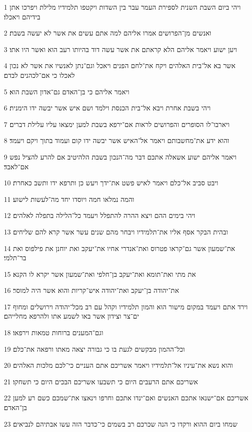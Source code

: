 \par 1 ויהי ביום השבת השנית לספירת העמר עבר בין השדות ויקטפו תלמידיו מלילת ויפרכו אתן בידיהם ויאכלו׃
\par 2 ואנשים מן־הפרושים אמרו אליהם למה אתם עשים את אשר לא יעשה בשבת׃
\par 3 ויען ישוע ויאמר אליהם הלא קראתם את אשר עשה דוד בהיותו רעב הוא ואשר היו אתו׃
\par 4 אשר בא אל־בית האלהים ויקח את־לחם הפנים ויאכל וגם־נתן לאנשיו את אשר לא נכון לאכלו כי אם־לכהנים לבדם׃
\par 5 ויאמר אליהם כי בן־האדם גם־אדון השבת הוא׃
\par 6 ויהי בשבת אחרת ויבא אל־בית הכנסת וילמד ושם איש אשר יבשה ידו הימנית׃
\par 7 ויארבו־לו הסופרים והפרושים לראות אם־ירפא בשבת למען ימצאו עליו עלילת דברים׃
\par 8 והוא ידע את־מחשבותם ויאמר אל־האיש אשר יבשה ידו קום ועמוד בתוך ויקם ויעמד׃
\par 9 ויאמר אליהם ישוע אשאלה אתכם דבר מה־הנכון בשבת הלהיטיב אם להרע להציל נפש אם־לאבד׃
\par 10 ויבט סביב אל־כלם ויאמר לאיש פשט את־ידך ויעש כן ותרפא ידו ותשב כאחרת׃
\par 11 והמה נמלאו חמה ויוסדו יחד מה־לעשות לישוע׃
\par 12 ויהי בימים ההם ויצא ההרה להתפלל ויעמד כל־הלילה בתפלה לאלהים׃
\par 13 ובהית הבקר אסף אליו את־תלמידיו ויבחר מהם שנים עשר אשר קרא להם שליחים׃
\par 14 את־שמעון אשר גם־קראו פטרוס ואת־אנדרי אחיו את־יעקב ואת יוחנן את פילפוס ואת בר־תלמי׃
\par 15 את מתי ואת־תומא ואת־יעקב בן־חלפי ואת־שמעון אשר יקרא לו הקנא׃
\par 16 את־יהודה בן־יעקב ואת־יהודה איש־קריות והוא אשר היה למוסר׃
\par 17 וירד אתם ויעמד במקום מישור הוא והמון תלמידיו וקהל עם רב מכל־יהודה וירושלים ומחוף ים־צר וצידון אשר באו לשמע אתו ולהרפא מחלייהם׃
\par 18 וגם־המענים ברוחות טמאות וירפאו׃
\par 19 וכל־ההמון מבקשים לגעת בו כי גבורה יצאה מאתו ורפאה את־כלם׃
\par 20 והוא נשא את־עיניו אל־תלמידיו ויאמר אשריכם אתם העניים כי־לכם מלכות האלהים׃
\par 21 אשריכם אתם הרעבים היום כי תשבעו אשריכם הבכים היום כי תשחקו׃
\par 22 אשריכם אם־ישנאו אתכם האנשים ואם־ינדו אתכם וחרפו וינאצו את־שמכם כשם רע למען בן־האדם׃
\par 23 שמחו ביום ההוא ורקדו כי הנה שכרכם רב בשמים כי־כדבר הזה עשו אבתיהם לנביאים׃
